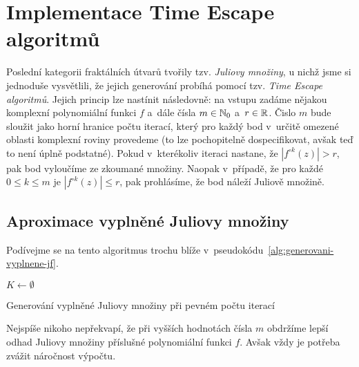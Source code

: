 \section{Implementace Time Escape algoritmů}\label{sec:implementace-tea}

Poslední kategorii fraktálních útvarů tvořily tzv. \emph{Juliovy množiny}, u nichž jsme si jednoduše vysvětlili, že jejich generování probíhá pomocí tzv. \emph{Time Escape algoritmů}. Jejich princip lze nastínit následovně: na vstupu zadáme nějakou komplexní polynomiální funkci $f$ a~dále čísla $m\in\mathbb{N}_0$ a~$r\in\mathbb{R}$. Čislo $m$ bude sloužit jako horní hranice počtu iterací, který pro každý bod v~určitě omezené oblasti komplexní roviny provedeme (to lze pochopitelně dospecifikovat, avšak teď to není úplně podstatné). Pokud v~kterékoliv iteraci nastane, že $|f^{\circ k}(z)|>r$, pak bod vyloučíme ze zkoumané množiny. Naopak v~případě, že pro každé $0\leqslant k\leqslant m$ je $|f^{\circ k}(z)|\leqslant r$, pak prohlásíme, že bod náleží Juliově množině.

\subsection{Aproximace vyplněné Juliovy množiny}\label{subsec:aproximace-vyplnene-juliovy-mnoziny}

Podívejme se na tento algoritmus trochu blíže v~pseudokódu~\ref{alg:generovani-vyplnene-jf}.
\begin{algorithm}
    $K\gets\emptyset$\;
    \;
    \caption{Generování vyplněné Juliovy množiny při pevném počtu iterací}
    \label{alg:generovani-vyplnene-jf}
\end{algorithm}
Nejspíše nikoho nepřekvapí, že při vyšších hodnotách čísla $m$ obdržíme lepší odhad Juliovy množiny příslušné polynomiální funkci $f$. Avšak vždy je potřeba zvážit náročnost výpočtu.

